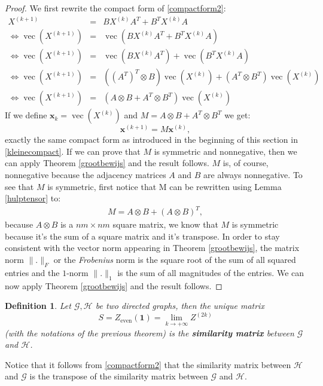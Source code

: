 \documentclass[a4paper,11pt]{report}
\newtheorem{definition}[theorem]{Definition}
\newcommand{\graf}{\mathscr{G}}
\newcommand{\grafeen}{\mathscr{H}}
\newcommand{\vect}{\operatorname{vec}}
\begin{document}
\begin{proof}
  We first rewrite the compact form of \ref{compactform2}:
  \begin{eqnarray*}
    X^{(k+1)} &=& BX^{(k)}A^T + B^TX^{(k)}A\\
 \Leftrightarrow   \vect(X^{(k+1)}) &=& \vect(BX^{(k)}A^T + B^TX^{(k)}A)\\
 \Leftrightarrow   \vect(X^{(k+1)}) &=& \vect(BX^{(k)}A^T) + \vect(B^TX^{(k)}A)\\
 \Leftrightarrow   \vect(X^{(k+1)}) &=& \left( (A^T)^T \otimes B\right)\vect(X^{(k)}) + \left( A^T \otimes B^T\right)\vect(X^{(k)})\\
  \Leftrightarrow  \vect(X^{(k+1)}) &=& (A \otimes B + A^T \otimes B^T)\vect(X^{(k)})
  \end{eqnarray*}
If we define $\mathbf{x}_k = \vect(X^{(k)})$ and $M = A \otimes B + A^T \otimes 
B^T$ we get:
$$\mathbf{x}^{(k+1)} = M\mathbf{x}^{(k)},$$
exactly the same compact form as introduced in the beginning of this section in 
\ref{kleinecompact}. If we can prove that $M$ is symmetric and nonnegative, then
we can apply Theorem \ref{grootbewijs} and the result follows. $M$ is, of 
course, nonnegative because the adjacency matrices $A$ and $B$ are always 
nonnegative. To see that $M$ is symmetric, first notice that M can be rewritten 
using Lemma \ref{hulptensor} to:
\begin{eqnarray}\label{uitgeschrevenvectornormaal}
M = A \otimes B + (A \otimes  B)^T,
\end{eqnarray}
because $A \otimes B$ is a $nm \times nm$ square matrix, we know that $M$ is 
symmetric because it's the sum of a square matrix and it's transpose. In order 
to stay consistent with the vector norm appearing in Theorem \ref{grootbewijs}, the matrix norm 
$\| .\|_F$ or the \emph{Frobenius} norm is the square root of the sum of all squared 
entries and the $1$-norm $\|.\|_1$ is the sum of all magnitudes of the entries. 
We can now apply Theorem \ref{grootbewijs} and the result follows.
\end{proof}
\begin{definition}
  Let $\graf, \grafeen$ be two directed graphs, then the unique matrix
   $$S = Z_\text{even}(\mathbf{1}) = \lim_{k\to +\infty} Z^{(2k)}$$ 
 (with the notations of the previous theorem) is the \textbf{similarity matrix} between $\graf$ and
   $\grafeen$.
\end{definition}
Notice that it follows from \ref{compactform2} that the similarity matrix 
between $\grafeen$ and $\graf$ is the transpose of the similarity matrix between 
$\graf$ and $\grafeen$.
\end{document}
